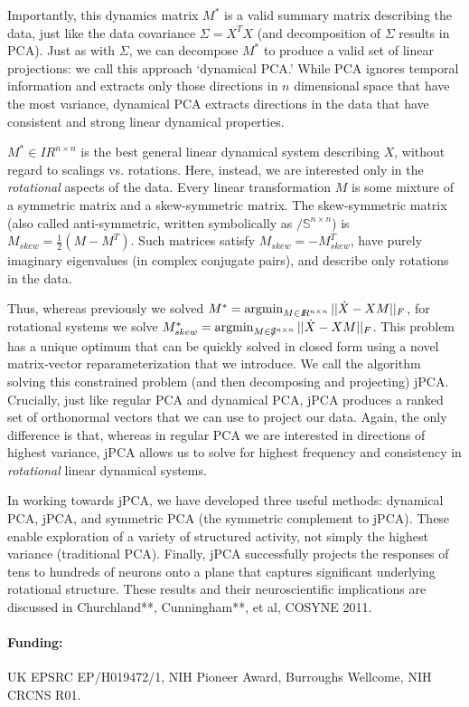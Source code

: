 \documentclass[12pt]{article}%
\newcommand{\reals}{I\!\!R} %
\newcommand{\skewsym}{/\!\!\!\mathbb{S}}
\def\argmin{\qopname\relax n{argmin}}
\begin{document}
Importantly, this dynamics matrix $M^*$ is a valid summary matrix describing the data, just like the data covariance $\Sigma = X^TX$ (and decomposition of $\Sigma$ results in PCA).  Just as with $\Sigma$, we can decompose $M^*$ to produce a valid set of linear projections: we call this approach `dynamical PCA.'  While PCA ignores temporal information and extracts only those directions in $n$ dimensional space that have the most variance, dynamical PCA extracts directions in the data that have consistent and strong linear dynamical properties.  

$M^*\in \reals^{n \times n}$ is the best general linear dynamical system describing $X$, without regard to scalings vs. rotations.   Here, instead, we are interested only in the \emph{rotational} aspects of the data.  Every linear transformation $M$ is some mixture of a symmetric matrix and a skew-symmetric matrix.  The skew-symmetric matrix (also called anti-symmetric, written symbolically as $\skewsym^{n \times n}$) is $M_{skew} = \frac{1}{2}(M - M^T)$.  Such matrices satisfy $M_{skew} = -M_{skew}^T$, have purely imaginary eigenvalues (in complex conjugate pairs), and describe only rotations in the data.  

Thus, whereas previously we solved $M^* = \argmin_{M \in \reals^{n \times n}} || \dot X - XM ||_F$, for rotational systems we solve $M_{skew}^* = \argmin_{M \in \skewsym^{n \times n}} || \dot X - XM ||_F$.   This problem has a unique optimum that can be quickly solved in closed form using a novel matrix-vector reparameterization that we introduce.   We call the algorithm solving this constrained problem (and then decomposing and projecting) jPCA.  Crucially, just like regular PCA and dynamical PCA, jPCA produces a ranked set of orthonormal vectors that we can use to project our data.  Again, the only difference is that, whereas in regular PCA we are interested in directions of highest variance, jPCA allows us to solve for highest frequency and consistency in \emph{rotational} linear dynamical systems.  

In working towards jPCA, we have developed three useful methods: dynamical PCA, jPCA, and symmetric PCA (the symmetric complement to jPCA).  These enable exploration of a variety of structured activity, not simply the highest variance (traditional PCA).  Finally, jPCA successfully projects the responses of tens to hundreds of neurons onto a plane that captures significant underlying rotational structure.  These results and their neuroscientific implications are discussed in Churchland**, Cunningham**, et al, COSYNE 2011.




\paragraph*{Funding:} UK EPSRC EP/H019472/1, NIH Pioneer Award, Burroughs Wellcome, NIH CRCNS R01. 


%

\end{document}
